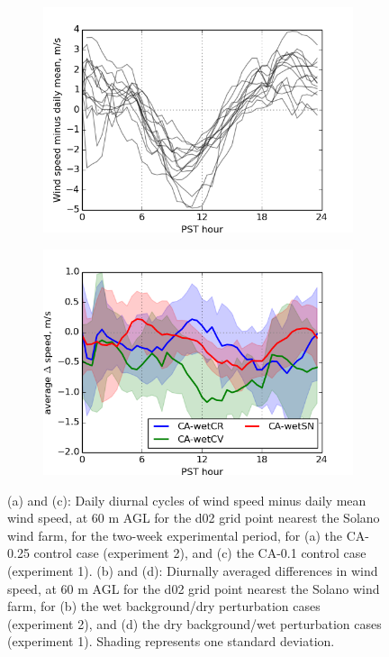 \begin{figure}[here]
\begin{subfigure}{0.5\textwidth}
\caption{}
\end{subfigure}
\begin{subfigure}{0.5\textwidth}
\includegraphics[width=1\textwidth]{ch3-wind/img/solano_controlwind_minusmean_CA0pt1_d02_level0.png}
\caption{}
\end{subfigure}
\begin{subfigure}{0.5\textwidth}
\includegraphics[width=1\textwidth]{ch3-wind/img/solano_diurnalwind_wet_regions_d02_level0.png}
\caption{}
\end{subfigure}
\caption{(a) and (c): Daily diurnal cycles of wind speed minus daily mean wind speed, at 60 m AGL for the d02 grid point nearest the Solano wind farm, for the two-week experimental period, for (a) the CA-0.25 control case (experiment 2), and (c) the CA-0.1 control case (experiment 1).  (b) and (d): Diurnally averaged differences in wind speed, at 60 m AGL for the d02 grid point nearest the Solano wind farm, for (b) the wet background/dry perturbation cases (experiment 2), and (d) the dry background/wet perturbation cases (experiment 1).  Shading represents one standard deviation.}
\label{fig:windSol_DiffDiurnalDryRg}
\end{figure}

